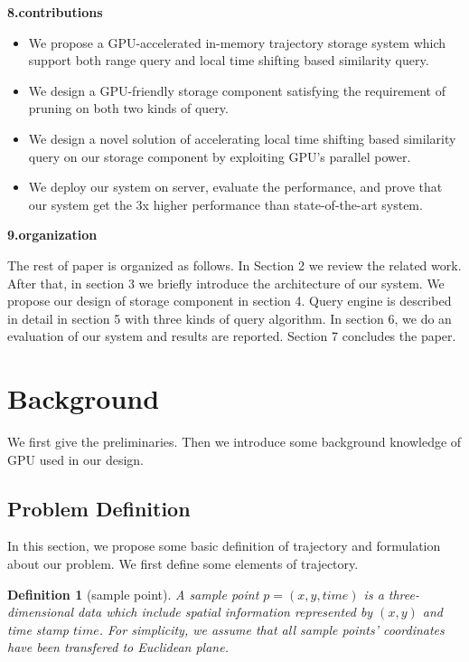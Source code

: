\documentclass[conference]{IEEEtran}
\begin{document}
\textbf{8.contributions}

\begin{itemize}
	\item We propose a GPU-accelerated in-memory trajectory storage system which support both range query and local time shifting based similarity query.
	\item We design a GPU-friendly storage component satisfying the requirement of pruning on both two kinds of query.
	\item We design a novel solution of accelerating local time shifting based similarity query on our storage component by exploiting GPU's parallel power.
	\item We deploy our system on server, evaluate the performance, and prove that our system get the 3x higher performance than state-of-the-art system.
\end{itemize}
	 
\textbf{9.organization}

	The rest of paper is organized as follows. In Section 2 we review the related work. After that, in section 3 we briefly introduce the architecture of our system. We propose our design of storage component in section 4. Query engine is described in detail in section 5 with three kinds of query algorithm. In section 6, we do an evaluation of our system and results are reported. Section 7 concludes the paper. 



\section{Background}
We first give the preliminaries.
Then we introduce some background knowledge of GPU used in our design.

\subsection{Problem Definition}
	In this section, we propose some basic definition of trajectory and formulation about our problem. We first define some elements of trajectory.
	
	\newtheorem{define}{Definition}
	\begin{define}[sample point]
		A sample point $p=(x,y,time)$ is a three-dimensional data which include spatial information represented by $(x,y)$ and time stamp $time$. For simplicity, we assume that all sample points' coordinates have been transfered to Euclidean plane.
	\end{define}
\end{document}
